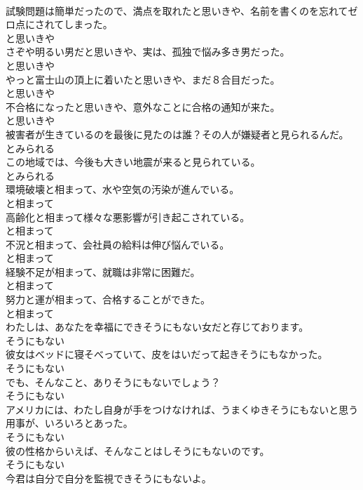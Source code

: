 \documentclass[8pt]{extreport}
\begin{document}
\begin{CJK}{UTF8}{min}
\\	試験問題は簡単だったので、満点を取れたと思いきや、名前を書くのを忘れてゼロ点にされてしまった。	
\\	と思いきや	
\\	さぞや明るい男だと思いきや、実は、孤独で悩み多き男だった。	
\\	と思いきや	
\\	やっと富士山の頂上に着いたと思いきや、まだ８合目だった。	
\\	と思いきや	
\\	不合格になったと思いきや、意外なことに合格の通知が来た。	
\\	と思いきや	
\\	被害者が生きているのを最後に見たのは誰？その人が嫌疑者と見られるんだ。	
\\	とみられる	
\\	この地域では、今後も大きい地震が来ると見られている。	
\\	とみられる	
\\	環境破壊と相まって、水や空気の汚染が進んでいる。	
\\	と相まって	
\\	高齢化と相まって様々な悪影響が引き起こされている。	
\\	と相まって	
\\	不況と相まって、会社員の給料は伸び悩んでいる。	
\\	と相まって	
\\	経験不足が相まって、就職は非常に困難だ。	
\\	と相まって	
\\	努力と運が相まって、合格することができた。	
\\	と相まって	
\\	わたしは、あなたを幸福にできそうにもない女だと存じております。	
\\	そうにもない	
\\	彼女はベッドに寝そべっていて、皮をはいだって起きそうにもなかった。	
\\	そうにもない	
\\	でも、そんなこと、ありそうにもないでしょう？	
\\	そうにもない	
\\	アメリカには、わたし自身が手をつけなければ、うまくゆきそうにもないと思う用事が、いろいろとあった。	
\\	そうにもない	
\\	彼の性格からいえば、そんなことはしそうにもないのです。	
\\	そうにもない	
\\	今君は自分で自分を監視できそうにもないよ。	

\end{CJK}
\end{document}
